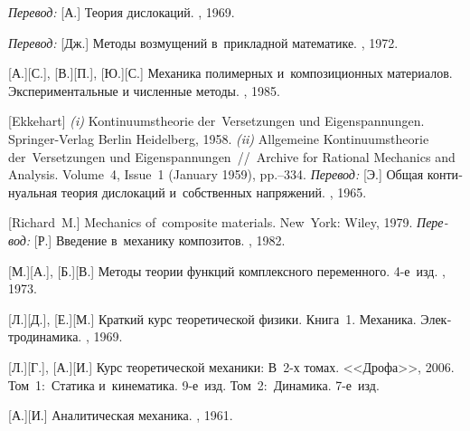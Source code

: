 \begin{thebibliography}{123}
\begin{otherlanguage}{russian}
\emph{Перевод:} [А.] Теория дислокаций. \mirpublisher, 1969. 

\emph{Перевод:} [Дж.] Методы возмущений в~прикладной математике. \mirpublisher, 1972. 

[А.][С.], [В.][П.], [Ю.][С.] Механика полимерных и~композиционных материалов. Экспериментальные и численные методы. \naukapublisher, 1985. 

[Ekkehart] \emph{(i)} Kontinuumstheorie der~Versetzungen und Eigen\-spannung\-en. Springer\hbox{-}Verlag Berlin Heidelberg, 1958. 
\emph{(ii)} Allgemeine Kontinuumstheorie der~Versetzungen und Eigen\-span\-nung\-en~//~Archive for Rational Mechanics and Analysis. Volume~4, Issue~1 (January 1959), pp.\hbox{--}334.
\emph{Перевод:} [Э.] Общая континуальная теория дислокаций и~собственных напряжений. \mirpublisher, 1965. 

[Richard~M.] Mechanics of~composite materials. New~York: Wiley, 1979. 
\emph{Перевод:} [Р.] Введение в~механику композитов. \mirpublisher, 1982. 

[М.][А.], [Б.][В.] Методы теории функций комплексного переменного. 4\hbox{-}е~изд. \naukapublisher, 1973. 

[Л.][Д.], [Е.][М.] Краткий курс теоретической физики. Книга~1. Механика. Электродинамика. \naukapublisher, 1969. 

[Л.][Г.], [А.][И.] Курс теоретической механики: В~2\hbox{-}х томах. <<Дрофа>>, 2006.
Том~1:~Статика и~кинематика. 9\hbox{-}е~изд. 
Том~2:~Динамика. 7\hbox{-}е~изд. 

[А.][И.] Аналитическая механика. \fizmatgiz, 1961. 


\end{otherlanguage}
\end{thebibliography}
